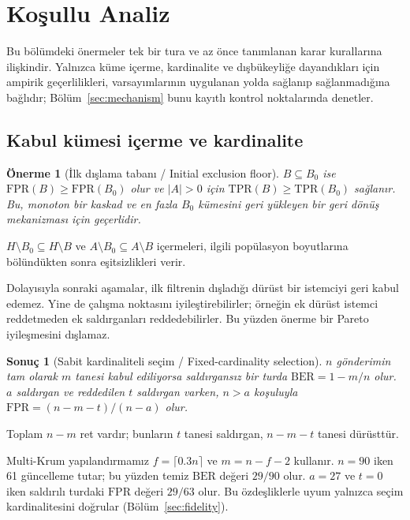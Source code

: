 \documentclass[journal]{IEEEtran}
\newtheorem{proposition}{Önerme}
\newtheorem{corollary}{Sonuç}
\newcommand{\BER}{\mathrm{BER}}
\begin{document}
\section{Koşullu Analiz}\label{sec:theory}
Bu bölümdeki önermeler tek bir tura ve az önce tanımlanan karar kurallarına ilişkindir. Yalnızca küme içerme, kardinalite ve dışbükeyliğe dayandıkları için ampirik geçerlilikleri, varsayımlarının uygulanan yolda sağlanıp sağlanmadığına bağlıdır; Bölüm~\ref{sec:mechanism} bunu kayıtlı kontrol noktalarında denetler.

\subsection{Kabul kümesi içerme ve kardinalite}
\begin{proposition}[İlk dışlama tabanı / Initial exclusion floor]\label{prop:floor}
$B\subseteq B_0$ ise $\mathrm{FPR}(B)\geq\mathrm{FPR}(B_0)$ olur ve $|A|>0$ için $\mathrm{TPR}(B)\geq\mathrm{TPR}(B_0)$ sağlanır. Bu, monoton bir kaskad ve en fazla $B_0$ kümesini geri yükleyen bir geri dönüş mekanizması için geçerlidir.
\end{proposition}
\begin{IEEEproof}
$H\setminus B_0\subseteq H\setminus B$ ve $A\setminus B_0\subseteq A\setminus B$ içermeleri, ilgili popülasyon boyutlarına bölündükten sonra eşitsizlikleri verir.
\end{IEEEproof}
Dolayısıyla sonraki aşamalar, ilk filtrenin dışladığı dürüst bir istemciyi geri kabul edemez. Yine de çalışma noktasını iyileştirebilirler; örneğin ek dürüst istemci reddetmeden ek saldırganları reddedebilirler. Bu yüzden önerme bir Pareto iyileşmesini dışlamaz.

\begin{corollary}[Sabit kardinaliteli seçim / Fixed-cardinality selection]\label{cor:cardinality}
$n$ gönderimin tam olarak $m$ tanesi kabul ediliyorsa saldırgansız bir turda $\BER=1-m/n$ olur. $a$ saldırgan ve reddedilen $t$ saldırgan varken, $n>a$ koşuluyla $\mathrm{FPR}=(n-m-t)/(n-a)$ olur.
\end{corollary}
\begin{IEEEproof}
Toplam $n-m$ ret vardır; bunların $t$ tanesi saldırgan, $n-m-t$ tanesi dürüsttür.
\end{IEEEproof}
Multi-Krum yapılandırmamız $f=\lceil0.3n\rceil$ ve $m=n-f-2$ kullanır. $n=90$ iken 61 güncelleme tutar; bu yüzden temiz $\BER$ değeri $29/90$ olur. $a=27$ ve $t=0$ iken saldırılı turdaki $\mathrm{FPR}$ değeri $29/63$ olur. Bu özdeşliklerle uyum yalnızca seçim kardinalitesini doğrular (Bölüm~\ref{sec:fidelity}).
\end{document}
